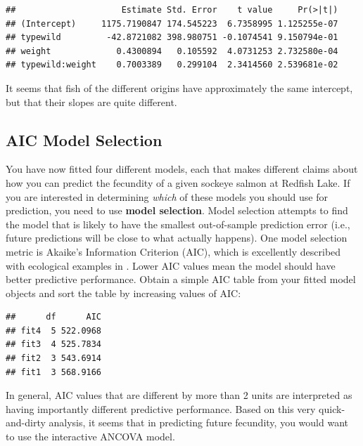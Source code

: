 \documentclass[]{book}
\newenvironment{Shaded}{\begin{snugshade}}{\end{snugshade}}
\newcommand{\KeywordTok}[1]{\textcolor[rgb]{0.13,0.29,0.53}{\textbf{#1}}}
\newcommand{\StringTok}[1]{\textcolor[rgb]{0.31,0.60,0.02}{#1}}
\newcommand{\OperatorTok}[1]{\textcolor[rgb]{0.81,0.36,0.00}{\textbf{#1}}}
\newcommand{\NormalTok}[1]{#1}
\theoremstyle{definition}
\theoremstyle{definition}
\theoremstyle{definition}
\theoremstyle{remark}
\begin{document}
\begin{verbatim}
##                     Estimate Std. Error    t value     Pr(>|t|)
## (Intercept)     1175.7190847 174.545223  6.7358995 1.125255e-07
## typewild         -42.8721082 398.980751 -0.1074541 9.150794e-01
## weight             0.4300894   0.105592  4.0731253 2.732580e-04
## typewild:weight    0.7003389   0.299104  2.3414560 2.539681e-02
\end{verbatim}

It seems that fish of the different origins have approximately the same
intercept, but that their slopes are quite different.

\subsection{AIC Model Selection}\label{aic-model-selection}

You have now fitted four different models, each that makes different
claims about how you can predict the fecundity of a given sockeye salmon
at Redfish Lake. If you are interested in determining \emph{which} of
these models you should use for prediction, you need to use
\textbf{model selection}. Model selection attempts to find the model
that is likely to have the smallest out-of-sample prediction error
(i.e., future predictions will be close to what actually happens). One
model selection metric is Akaike's Information Criterion (AIC), which is
excellently described with ecological examples in \citet{aic-cite}.
Lower AIC values mean the model should have better predictive
performance. Obtain a simple AIC table from your fitted model objects
and sort the table by increasing values of AIC:

\begin{Shaded}
\end{Shaded}

\begin{verbatim}
##      df      AIC
## fit4  5 522.0968
## fit3  4 525.7834
## fit2  3 543.6914
## fit1  3 568.9166
\end{verbatim}

In general, AIC values that are different by more than 2 units are
interpreted as having importantly different predictive performance.
Based on this very quick-and-dirty analysis, it seems that in predicting
future fecundity, you would want to use the interactive ANCOVA model.
\end{document}
